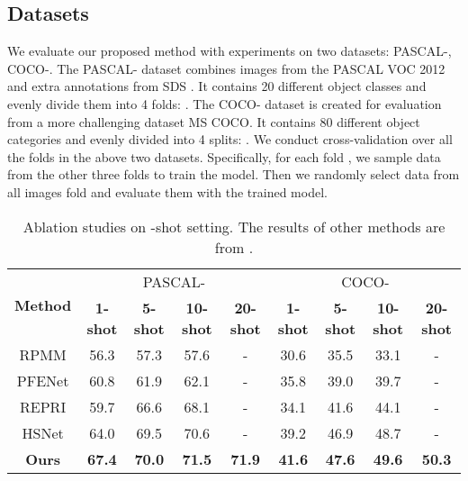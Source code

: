 \documentclass[journal]{IEEEtran}
\begin{document}
\subsection{Datasets}
We evaluate our proposed method with experiments on two datasets: PASCAL-\cite{shaban2017one}, COCO-\cite{lin2014microsoft}. The PASCAL- dataset combines images from the PASCAL VOC 2012\cite{everingham2015pascal} and extra annotations from SDS \cite{hariharan2014simultaneous}. It contains 20 different object classes and evenly divide them into 4 folds: . The COCO- dataset is created for evaluation from a more challenging dataset MS COCO\cite{lin2014microsoft}. It contains 80 different object categories and evenly divided into 4 splits: . We conduct cross-validation over all the folds in the above two datasets. Specifically, for each fold , we sample data from the other three folds to train the model. Then we randomly select data from  all images fold  and evaluate them with the trained model.

\begin{table*}[t]
	\renewcommand\arraystretch{1.2}
	\setlength{\tabcolsep}{3.8mm}
	\caption{Ablation studies on -shot setting. The results of other methods are from \cite{min2021hypercorrelation}.}
	\label{table:ab_shot}
	\begin{center}
		\begin{tabular}{c|cccc|cccc}
			\hline
			\multirow{2}{*}{\textbf{Method}} 
			& \multicolumn{4}{c}{PASCAL-} & \multicolumn{4}{c}{COCO-} \\ 
			&  { \textbf{1-shot} } &  { \textbf{5-shot} } &  { \textbf{10-shot} } &  { \textbf{20-shot}}  &  { \textbf{1-shot} } &  { \textbf{5-shot} } &  { \textbf{10-shot} } &  { \textbf{20-shot}}  \\ 
			\hline
			 {RPMM \cite{yang2020prototype}} &  {56.3} &  {57.3} &  {57.6} &  {-} &  {30.6} &  {35.5} &  {33.1} &  {-} \\
			 {PFENet\cite{tian2020prior}} &  {60.8} &  {61.9} &  {62.1} &  {-} &  {35.8} &  {39.0} &  {39.7} &  {- }\\
			 {REPRI\cite{boudiaf2021few}} &  {59.7} &  {66.6} &  {68.1} &  {-} &  {34.1} &  {41.6} &  {44.1} &  {-}\\
			 {HSNet\cite{min2021hypercorrelation}} &  {64.0} &  {69.5} &  {70.6} &  {-} &  {39.2} &  {46.9} &  {48.7} &  {-}\\
			 {\textbf{Ours}} & {\textbf{67.4  }} &  {\textbf{ 70.0  }} &  {\textbf{ 71.5  }} &  {\textbf{ 71.9 }}&  {\textbf{41.6  }} &  {\textbf{ 47.6  }} &  {\textbf{ 49.6   }} &  {\textbf{ 50.3  }}\\	
			\hline
		\end{tabular}
	\end{center}
\end{table*}
\end{document}
